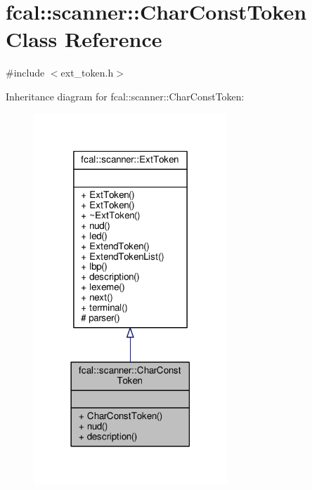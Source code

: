 \hypertarget{classfcal_1_1scanner_1_1CharConstToken}{}\section{fcal\+:\+:scanner\+:\+:Char\+Const\+Token Class Reference}
\label{classfcal_1_1scanner_1_1CharConstToken}


{\ttfamily \#include $<$ext\+\_\+token.\+h$>$}



Inheritance diagram for fcal\+:\+:scanner\+:\+:Char\+Const\+Token\+:
\nopagebreak
\begin{figure}[H]
\begin{center}
\leavevmode
\includegraphics[width=206pt]{classfcal_1_1scanner_1_1CharConstToken__inherit__graph}
\end{center}
\end{figure}


